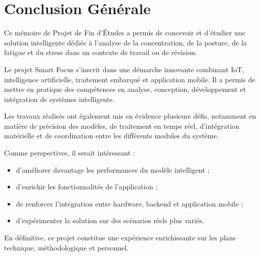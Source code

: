 \chapter*{Conclusion Générale}
\label{chap:conclusion}

Ce mémoire de Projet de Fin d’Études a permis de concevoir et d’étudier une solution intelligente dédiée à l’analyse de la concentration, de la posture, de la fatigue et du stress dans un contexte de travail ou de révision.

Le projet Smart Focus s’inscrit dans une démarche innovante combinant \ac{IoT}, intelligence artificielle, traitement embarqué et application mobile. Il a permis de mettre en pratique des compétences en analyse, conception, développement et intégration de systèmes intelligents.

Les travaux réalisés ont également mis en évidence plusieurs défis, notamment en matière de précision des modèles, de traitement en temps réel, d’intégration matérielle et de coordination entre les différents modules du système.

Comme perspectives, il serait intéressant :
\begin{itemize}
    \item d’améliorer davantage les performances du modèle intelligent ;
    \item d’enrichir les fonctionnalités de l’application ;
    \item de renforcer l’intégration entre hardware, backend et application mobile ;
    \item d’expérimenter la solution sur des scénarios réels plus variés.
\end{itemize}

En définitive, ce projet constitue une expérience enrichissante sur les plans technique, méthodologique et personnel.